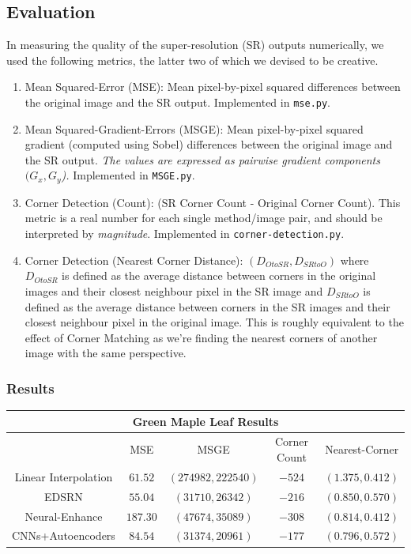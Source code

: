 \documentclass[letterpaper,12pt]{article}
\begin{document}
\subsection*{Evaluation}

In measuring the quality of the super-resolution (SR) outputs numerically, we used the following metrics, the latter two of which we devised to be creative.

\begin{enumerate}
    \item Mean Squared-Error (MSE): Mean pixel-by-pixel squared differences between the original image and the SR output. Implemented in \texttt{mse.py}.
    \item Mean Squared-Gradient-Errors (MSGE): Mean pixel-by-pixel squared gradient (computed using Sobel) differences between the original image and the SR output. \textit{The values are expressed as pairwise gradient components $(G_x, G_y$).} Implemented in \texttt{MSGE.py}.
    \item Corner Detection (Count): (SR Corner Count - Original Corner Count). This metric is a real number for each single method/image pair, and should be interpreted by \textit{magnitude}. Implemented in \texttt{corner-detection.py}.
    \item Corner Detection (Nearest Corner Distance): $(D_{OtoSR},D_{SRtoO})$ where $D_{OtoSR}$ is defined as the average distance between corners in the original images and their closest neighbour pixel in the SR image and $D_{SRtoO}$ is defined as the average distance between corners in the SR images and their closest neighbour pixel in the original image. This is roughly equivalent to the effect of Corner Matching as we're finding the nearest corners of another image with the same perspective.
\end{enumerate}

\pagebreak
\subsubsection*{Results}

\begin{center}\begin{tabular}{ |c||c|c|c|c| }
    \hline
    \multicolumn{5}{|c|}{Green Maple Leaf Results} \\
    \hline
    & MSE & MSGE\* & Corner Count & Nearest-Corner\\
    \hline
    Linear Interpolation & $61.52$ & $(274982, 222540)$ & $-524$ & $(1.375, 0.412)$\\
    EDSRN & $55.04$ & $(31710, 26342)$ & $-216$ & $(0.850, 0.570)$\\
    Neural-Enhance & $187.30$ & $(47674, 35089)$ & $-308$ & $(0.814, 0.412)$\\
    CNNs+Autoencoders & $84.54$ & $(31374, 20961)$ & $-177$ & $(0.796, 0.572)$\\
    \hline
\end{tabular}\end{center}
\end{document}
